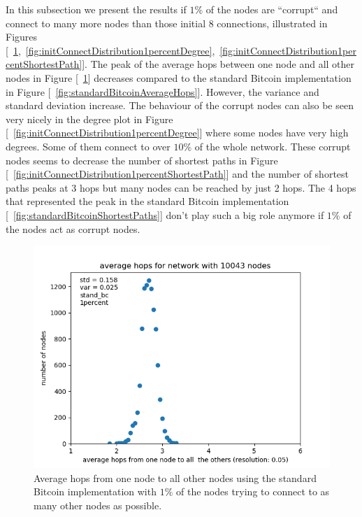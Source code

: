\documentclass[a4paper, oneside]{discothesis}
\begin{document}
In this subsection we present the results if $1\%$ of the nodes are ``corrupt`` and connect to many more nodes than those initial 8 connections, illustrated in Figures [~\ref{fig:initConnectDistribution1percentAverage},~\ref{fig:initConnectDistribution1percentDegree},~\ref{fig:initConnectDistribution1percentShortestPath}].
The peak of the average hops between one node and all other nodes in Figure [~\ref{fig:initConnectDistribution1percentAverage}] decreases compared to the standard Bitcoin implementation in Figure [~\ref{fig:standardBitcoinAverageHops}]. However, the variance and standard deviation increase.
The behaviour of the corrupt nodes can also be seen very nicely in the degree plot in Figure [~\ref{fig:initConnectDistribution1percentDegree}] where some nodes have very high degrees. Some of them connect to over $10\%$ of the whole network. These corrupt nodes seems to decrease the number of shortest paths in Figure [~\ref{fig:initConnectDistribution1percentShortestPath}] and the number of shortest paths peaks at 3 hops but many nodes can be reached by just 2 hops. The 4 hops that represented the peak in the standard Bitcoin implementation [~\ref{fig:standardBitcoinShortestPaths}] don't play such a big role anymore if $1\%$ of the nodes act as corrupt nodes.

\begin{figure}
    \centering
    \includegraphics[width=.8\columnwidth]{figures/initConnectDistribution/1percent/average-hops-for-network-with-10043-nodes.png}
    \caption{Average hops from one node to all other nodes using the standard Bitcoin implementation with $1\%$ of the nodes trying to connect to as many other nodes as possible.}
    \label{fig:initConnectDistribution1percentAverage}
\end{figure}
\end{document}

